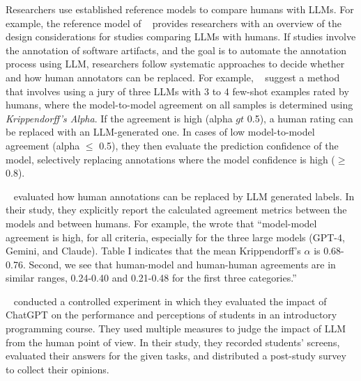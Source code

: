 Researchers \should use established reference models to compare humans with LLMs.
For example, the reference model of \citeauthor{Schneider2025ReferenceModel}~\cite{Schneider2025ReferenceModel} provides researchers with an overview of the design considerations for studies comparing LLMs with humans.
If studies involve the annotation of software artifacts, and the goal is to automate the annotation process using LLM, researchers \should follow systematic approaches to decide whether and how human annotators can be replaced.
For example, \citeauthor{DBLP:conf/msr/AhmedDTP25}~\cite{DBLP:conf/msr/AhmedDTP25} suggest a method that involves using a jury of three LLMs with 3 to 4 few-shot examples rated by humans, where the model-to-model agreement on all samples is determined using \emph{Krippendorff's Alpha}.
If the agreement is high (alpha $gt$ 0.5), a human rating can be replaced with an LLM-generated one.
In cases of low model-to-model agreement (alpha $\le$ 0.5), they then evaluate the prediction confidence of the model, selectively replacing annotations where the model confidence is high ($\ge$ 0.8).


\citeauthor{DBLP:conf/msr/AhmedDTP25}~\cite{DBLP:conf/msr/AhmedDTP25} evaluated how human annotations can be replaced by LLM generated labels.
In their study, they explicitly report the calculated agreement metrics between the models and between humans.
For example, the wrote that ``model-model agreement is high, for all criteria, especially for the three large models (GPT-4, Gemini, and Claude). Table I indicates that the mean Krippendorff's $\alpha$ is 0.68-0.76.  Second, we see that human-model and human-human agreements are in similar ranges, 0.24-0.40 and 0.21-0.48 for the first three categories.''

\citeauthor{DBLP:conf/icse/XueCBTH24}~\cite{DBLP:conf/icse/XueCBTH24} conducted a controlled experiment in which they evaluated the impact of ChatGPT on the performance and perceptions of students in an introductory programming course.
They used multiple measures to judge the impact of LLM from the human point of view.
In their study, they recorded students' screens, evaluated their answers for the given tasks, and distributed a post-study survey to collect their opinions.

